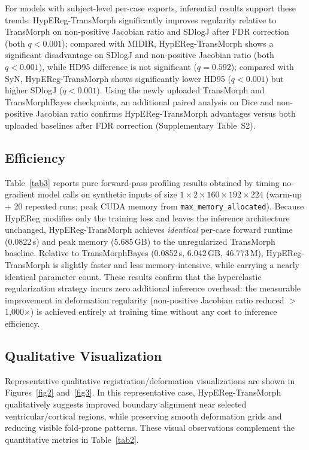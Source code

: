 \documentclass[jimaging,article,submit,pdftex,moreauthors]{Definitions/mdpi}
\begin{document}
For models with subject-level per-case exports, inferential results support these trends: HypEReg-TransMorph significantly improves regularity relative to TransMorph on non-positive Jacobian ratio and SDlogJ after FDR correction (both \(q<0.001\)); compared with MIDIR, HypEReg-TransMorph shows a significant disadvantage on SDlogJ and non-positive Jacobian ratio (both \(q<0.001\)), while HD95 difference is not significant (\(q=0.592\)); compared with SyN, HypEReg-TransMorph shows significantly lower HD95 (\(q<0.001\)) but higher SDlogJ (\(q<0.001\)). Using the newly uploaded TransMorph and TransMorphBayes checkpoints, an additional paired analysis on Dice and non-positive Jacobian ratio confirms HypEReg-TransMorph advantages versus both uploaded baselines after FDR correction (Supplementary Table~S2).

\subsection{Efficiency}
Table~\ref{tab3} reports pure forward-pass profiling results obtained by timing no-gradient model calls on synthetic inputs of size $1\times2\times160\times192\times224$ (warm-up + 20 repeated runs; peak CUDA memory from \texttt{max\_memory\_allocated}). Because HypEReg modifies only the training loss and leaves the inference architecture unchanged, HypEReg-TransMorph achieves \emph{identical} per-case forward runtime (0.0822\,s) and peak memory (5.685\,GB) to the unregularized TransMorph baseline. Relative to TransMorphBayes (0.0852\,s, 6.042\,GB, 46.773\,M), HypEReg-TransMorph is slightly faster and less memory-intensive, while carrying a nearly identical parameter count. These results confirm that the hyperelastic regularization strategy incurs zero additional inference overhead: the measurable improvement in deformation regularity (non-positive Jacobian ratio reduced $>$1,000$\times$) is achieved entirely at training time without any cost to inference efficiency.

\subsection{Qualitative Visualization}
Representative qualitative registration/deformation visualizations are shown in Figures~\ref{fig2} and~\ref{fig3}. In this representative case, HypEReg-TransMorph qualitatively suggests improved boundary alignment near selected ventricular/cortical regions, while preserving smooth deformation grids and reducing visible fold-prone patterns. These visual observations complement the quantitative metrics in Table~\ref{tab2}.
\end{document}
